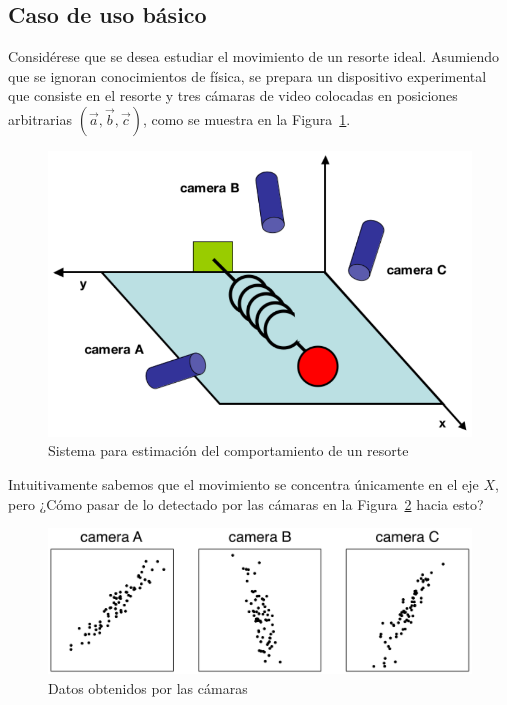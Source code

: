 \documentclass{article}
\begin{document}
\subsection{Caso de uso básico}
\label{sub:ejemplo_basico}
Considérese que se desea estudiar el movimiento de un resorte ideal.
Asumiendo que se ignoran conocimientos de física, se prepara un dispositivo experimental que consiste en el resorte y tres cámaras de video colocadas en posiciones arbitrarias $(\overrightarrow{a},\overrightarrow{b},\overrightarrow{c})$, como se muestra en la Figura~\ref{fig:resorte}.
\begin{figure}
	\centering
	\includegraphics[scale=0.35]{resources/images/resorte}
	\caption{Sistema para estimación del comportamiento de un resorte}
	\label{fig:resorte}
\end{figure}

Intuitivamente sabemos que el movimiento se concentra únicamente en el eje $X$, pero ¿Cómo pasar de lo detectado por las cámaras en la Figura~\ref{fig:camaras} hacia esto?
\begin{figure}
	\centering
	\includegraphics[width=\columnwidth]{resources/images/camaras}
	\caption{Datos obtenidos por las cámaras}
	\label{fig:camaras}
\end{figure}
\end{document}
